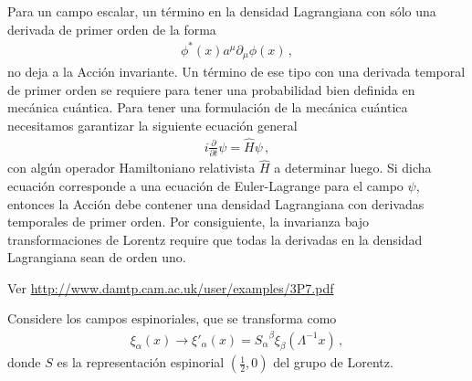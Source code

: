 Para un campo escalar, un término en la densidad Lagrangiana con sólo una derivada de primer orden de la forma
\begin{align}
\label{eq:nolor}
  \phi^*(x)a^\mu\partial_\mu\phi(x)\,,
\end{align}
no deja a la Acción invariante. Un término de ese tipo con una derivada temporal de primer orden se requiere para tener una probabilidad bien definida en mecánica cuántica.
Para tener una formulación de la mecánica cuántica necesitamos garantizar la siguiente ecuación general
\begin{align}
  i\frac{\partial}{\partial t}\psi=\hat{H} \psi\,,  
\end{align}
con algún operador Hamiltoniano relativista  $\widehat{H}$ a determinar luego. Si dicha ecuación corresponde a una ecuación de Euler-Lagrange para el campo $\psi$,
entonces la Acción debe contener una densidad Lagrangiana con derivadas temporales de primer orden. Por consiguiente, la invarianza bajo transformaciones de Lorentz require que todas la derivadas en la densidad Lagrangiana sean de orden uno.

Ver \url{http://www.damtp.cam.ac.uk/user/examples/3P7.pdf}

\begin{frame}
Considere los campos espinoriales, que se transforma como
\begin{align}
\label{eq:184qft}
  \xi_\alpha(x)\to\xi'_\alpha(x)={S_\alpha}^\beta\xi_\beta(\Lambda^{-1}x)\,, 
\end{align}
donde $S$ es la representación espinorial $(\frac{1}{2},0)$ del grupo de Lorentz. 
\end{frame}

